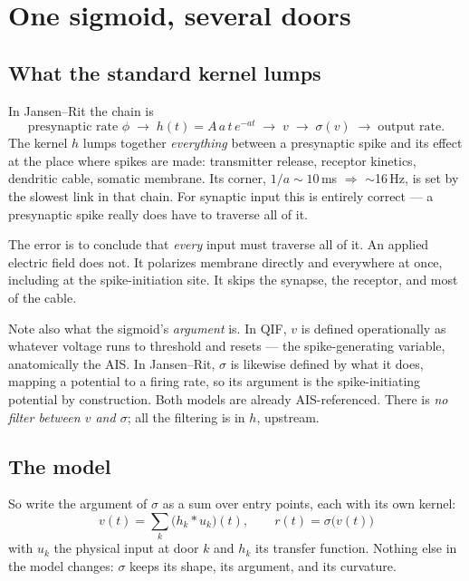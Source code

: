 \documentclass[11pt,a4paper]{article}
\begin{document}
\section{One sigmoid, several doors}

\subsection{What the standard kernel lumps}

In Jansen--Rit the chain is
\[
\text{presynaptic rate }\phi
\;\longrightarrow\;
h(t)=A\,a\,t\,e^{-at}
\;\longrightarrow\;
v
\;\longrightarrow\;
\sigma(v)
\;\longrightarrow\;
\text{output rate}.
\]
The kernel $h$ lumps together \emph{everything} between a presynaptic spike and its effect at the place
where spikes are made: transmitter release, receptor kinetics, dendritic cable, somatic membrane. Its
corner, $1/a\sim10$\,ms $\Rightarrow$ $\sim$16\,Hz, is set by the slowest link in that chain. For
synaptic input this is entirely correct --- a presynaptic spike really does have to traverse all of it.

The error is to conclude that \emph{every} input must traverse all of it. An applied electric field does
not. It polarizes membrane directly and everywhere at once, including at the spike-initiation site. It
skips the synapse, the receptor, and most of the cable.

Note also what the sigmoid's \emph{argument} is. In QIF, $v$ is defined operationally as whatever
voltage runs to threshold and resets --- the spike-generating variable, anatomically the AIS. In
Jansen--Rit, $\sigma$ is likewise defined by what it does, mapping a potential to a firing rate, so its
argument is the spike-initiating potential by construction. Both models are already AIS-referenced.
There is \emph{no filter between $v$ and $\sigma$}; all the filtering is in $h$, upstream.

\subsection{The model}

So write the argument of $\sigma$ as a sum over entry points, each with its own kernel:
\begin{equation}
\boxed{\;v(t)=\sum_k \bigl(h_k * u_k\bigr)(t),
\qquad r(t)=\sigma\bigl(v(t)\bigr)\;}
\label{eq:doors}
\end{equation}
with $u_k$ the physical input at door $k$ and $h_k$ its transfer function. Nothing else in the model
changes: $\sigma$ keeps its shape, its argument, and its curvature.
\end{document}
